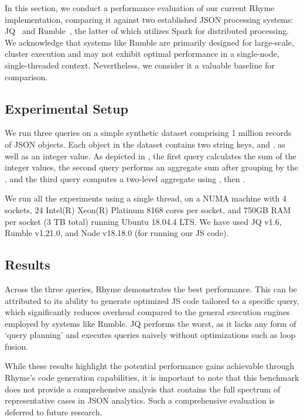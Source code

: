 \documentclass[runningheads]{llncs}
\newcommand{\lang}{Rhyme}
\begin{document}
In this section, we conduct a performance evaluation of our current \lang{}
implementation, comparing it against two established JSON processing
systems: JQ~\cite{jq} and Rumble~\cite{rumble_vldb}, the latter of which
utilizes Spark for distributed processing.
We acknowledge that systems like Rumble are primarily designed for large-scale,
cluster execution and may not exhibit optimal performance in a single-node,
single-threaded context.
Nevertheless, we consider it a valuable baseline for comparison.

\subsection{Experimental Setup}
We run three queries on a simple synthetic dataset comprising 1 million records of
JSON objects.
Each object in the dataset contains two string keys,  and , 
as well as an integer value.
As depicted in , the first query calculates the sum of the integer
values, the second query performs an aggregate sum after grouping by the ,
and the third query computes a two-level aggregate using , then .

We run all the experiments using a single thread, on a NUMA machine
with 4 sockets, 24 Intel(R) Xeon(R) Platinum 8168 cores
per socket, and 750GB RAM per socket (3 TB total) running Ubuntu
18.04.4 LTS.
We have used JQ v1.6, Rumble v1.21.0, and Node v18.18.0 (for running our JS code).

\subsection{Results}
Across the three queries, \lang{} demonstrates the best performance.
This can be attributed to its ability to generate optimized JS code tailored
to a specific query, which significantly reduces overhead compared to the
general execution engines employed by systems like Rumble.
JQ performs the worst, as it lacks any form of
`query planning' and executes queries naively without optimizations
such as loop fusion.

While these results highlight the potential performance gains achievable
through \lang{}'s code generation capabilities, it is important to note
that this benchmark does not provide a comprehensive analysis that contains the
full spectrum of representative cases in JSON analytics.
Such a comprehensive evaluation is deferred to future research.
\end{document}
